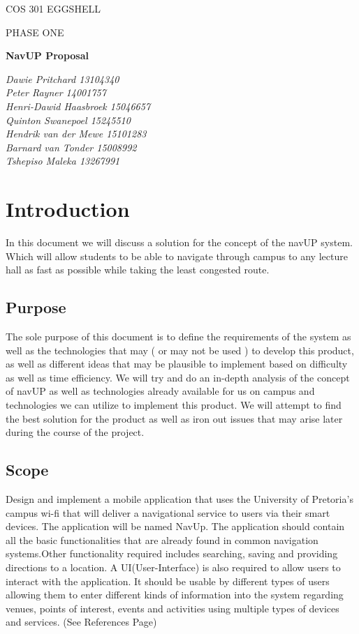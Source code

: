 \documentclass{article}
\begin{document}
\begin{titlepage}
	\centering
	{\scshape\LARGE COS 301 EGGSHELL   \par}
	\vspace{1cm}
	{\scshape\Large PHASE ONE \par}
	\vspace{1.5cm}
	{\huge\bfseries NavUP Proposal\par}
	\vspace{2cm}
	{\Large\itshape  Dawie Pritchard 13104340 \\ Peter Rayner 14001757 \\ Henri-Dawid Haasbroek 15046657 \\ Quinton Swanepoel 15245510 \\ Hendrik van der Mewe 15101283 \\ Barnard van Tonder 15008992 \\ Tshepiso Maleka 13267991\par}
	
\end{titlepage}

\tableofcontents

\newpage
\centering
\section{Introduction}
In this document we will discuss a solution for the concept of the navUP system. Which will allow students to be able to navigate through campus to any lecture hall as fast as possible while taking the least congested route.
\subsection {Purpose}
The sole purpose of this document is to define the requirements of the system as well as the technologies that may ( or may not be used ) to develop this product, as well as different ideas that may be plausible to implement based on difficulty as well as time efficiency. We will try and do an in-depth analysis of the concept of navUP as well as technologies already available for us on campus and technologies we can utilize to implement this product. We will attempt to find the best solution for the product as well as iron out issues that may arise later during the course of the project. 
\subsection {Scope}
Design and implement a mobile application that uses the University of Pretoria's campus wi-fi that will deliver a navigational service to users via their smart devices. The application will be named NavUp. The application should contain all the basic functionalities that are already found in common navigation systems.Other functionality required includes searching, saving and providing directions to a location. A UI(User-Interface) is also required to allow users to interact with the application. It should be usable by different types of users allowing them to enter different kinds of information into the system regarding venues, points of interest, events and activities using multiple types of devices and services. (See References Page)
\end{document}
